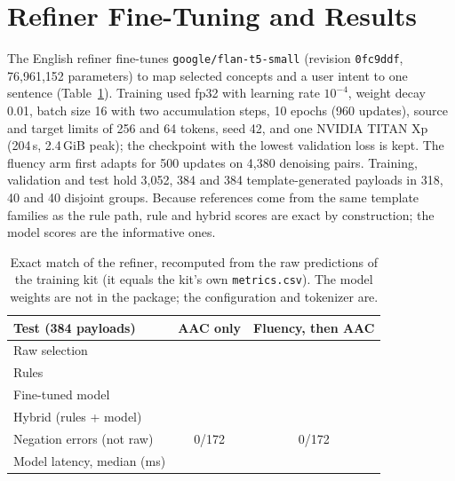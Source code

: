 \section{Refiner Fine-Tuning and Results}
\label{app:refiner}
The English refiner fine-tunes \texttt{google/flan-t5-small} (revision \texttt{0fc9ddf}, 76,961,152 parameters) to map selected concepts and a user intent to one sentence (Table~\ref{tab:refiner}). Training used fp32 with learning rate $10^{-4}$, weight decay 0.01, batch size 16 with two accumulation steps, 10 epochs (960 updates), source and target limits of 256 and 64 tokens, seed 42, and one NVIDIA TITAN Xp (204\,s, 2.4\,GiB peak); the checkpoint with the lowest validation loss is kept. The fluency arm first adapts for 500 updates on 4,380 denoising pairs. Training, validation and test hold 3,052, 384 and 384 template-generated payloads in 318, 40 and 40 disjoint groups. Because references come from the same template families as the rule path, rule and hybrid scores are exact by construction; the model scores are the informative ones.

\begin{table}[t]
\centering\footnotesize
\setlength{\tabcolsep}{3pt}
\begin{tabular}{@{}lcc@{}}
\toprule
Test (384 payloads) & AAC only & Fluency, then AAC \\
\midrule
Raw selection & \RefARaw{} & \RefFRaw{} \\
Rules & \RefARules{} & \RefFRules{} \\
Fine-tuned model & \RefAModel{} & \RefFModel{} \\
Hybrid (rules + model) & \RefAHybrid{} & \RefFHybrid{} \\
Negation errors (not raw) & 0/172 & 0/172 \\
Model latency, median (ms) & \RefALat{} & \RefFLat{} \\
\bottomrule
\end{tabular}
\caption{Exact match of the refiner, recomputed from the raw predictions of the training kit (it equals the kit's own \texttt{metrics.csv}). The model weights are not in the package; the configuration and tokenizer are.}
\label{tab:refiner}
\end{table}
